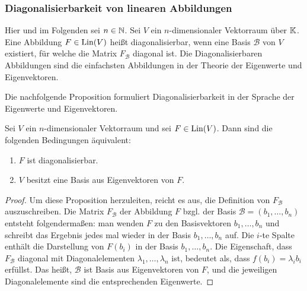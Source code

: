 \subsubsection{Diagonalisierbarkeit von linearen Abbildungen}

Hier und im Folgenden sei $n \in \mathbb N$.
Sei $ V $ ein $ n $-dimensionaler Vektorraum über $ \mathbb K $. Eine Abbildung $ F \in \operatorname{Lin}(V) $ heißt diagonalisierbar, wenn eine Basis $ \mathcal{B} $ von $ V $ existiert, für welche die Matrix $ F_\mathcal{B} $ diagonal ist. Die Diagonalisierbaren Abbildungen sind die einfachsten Abbildungen in der Theorie der Eigenwerte und Eigenvektoren. 

Die nachfolgende Proposition formuliert Diagonalisierbarkeit in der Sprache der Eigenwerte und Eigenvektoren. 

\begin{propn}
	Sei $ V $ ein $ n $-dimensionaler Vektorraum und sei $ F \in \operatorname{Lin}(V) $. Dann sind die folgenden Bedingungen äquivalent:
	\begin{enumerate}
		\item
			$ F $ ist diagonalisierbar.
		\item
			$ V $ besitzt eine Basis aus Eigenvektoren von $ F $.
	\end{enumerate}
\end{propn}
\begin{proof}
	Um diese Proposition herzuleiten, reicht es aus, die Definition von $F_\mathcal{B}$ auszuschreiben. Die Matrix $F_\mathcal{B}$ der Abbildung $F$ bzgl. der Basis $\mathcal{B} = (b_1,\ldots,b_n)$ entsteht folgendermaßen: man wenden $F$ zu den Basisvektoren $b_1,\ldots,b_n$ und schreibt das Ergebnis jedes mal wieder in der Basis $b_1,\ldots,b_n$ auf. Die $i$-te Spalte enthält die Darstellung von $F(b_i)$ in der Basis $b_1,\ldots,b_n$. Die Eigenschaft, dass $F_\mathcal{B}$ diagonal mit Diagonalelementen $\lambda_1,\ldots,\lambda_n$ ist, bedeutet als, dass $f(b_i) = \lambda_i b_i$ erfüllst. Das heißt, $\mathcal{B}$ ist Basis aus Eigenvektoren von $F$, und die jeweiligen Diagonalelemente sind die entsprechenden Eigenwerte.
\end{proof}

